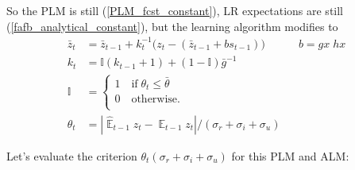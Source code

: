 \documentclass[11pt]{article}
\renewcommand{\[}{\begin{equation}}
\renewcommand{\]}{\end{equation}}
\DeclareMathOperator{\E}{\mathbb{E}}
\begin{document}
So the PLM is still (\ref{PLM_fcst_constant}), LR expectations are still (\ref{fafb_analytical_constant}), but the learning algorithm modifies to
 \begin{align}
\bar{z}_{t} & = \bar{z}_{t-1} +k_t^{-1}\big(z_{t} -(\bar{z}_{t-1}+bs_{t-1}) \big) \quad  \quad \quad b= gx\;hx \label{RLS_anchoring} \\
k_t &= \mathbb{I}(k_{t-1} +1) + (1-\mathbb{I})\bar{g}^{-1} \label{gain} \\
\mathbb{I} & = \begin{cases} 1 \quad \text{if} \; \theta_t \leq \bar{\theta}  \\ 0 \quad \text{otherwise.}\\
\end{cases} \\
\theta_t & = |\hat{\E}_{t-1}z_t - \E_{t-1}z_t| / (\sigma_r + \sigma_i + \sigma_u) \label{criterion}
\end{align}

Let's evaluate the criterion $\theta_t (\sigma_r + \sigma_i + \sigma_u)$ for this PLM and ALM:
 
\end{document}
